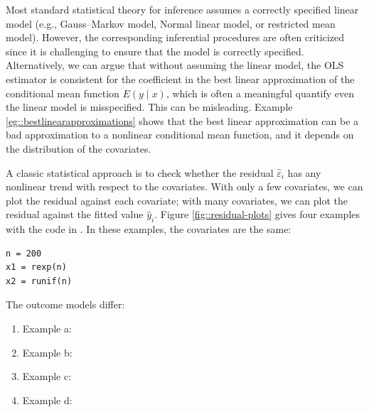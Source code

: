 Most standard statistical theory for inference assumes a correctly specified linear model (e.g., Gauss--Markov model, Normal linear model, or restricted mean model). However, the corresponding inferential procedures are often criticized since it is challenging to ensure that the model is correctly specified. Alternatively, we can argue that without assuming the linear model, the OLS estimator is consistent for the coefficient in the best linear approximation of the conditional mean function $E(y\mid x)$, which is often a meaningful quantify even the linear model is misspecified. This can be misleading. Example \ref{eg::bestlinearapproximations} shows that the best linear approximation can be a bad approximation to a nonlinear conditional mean function, and it depends on the distribution of the covariates. 



A classic statistical approach is to check whether the residual $\hat\varepsilon_i$ has any nonlinear trend with respect to the covariates. With only a few covariates, we can plot the residual against each covariate; with many covariates, we can plot the residual against the fitted value $\hat{y}_i$. Figure \ref{fig::residual-plots} gives four examples with the  code in . In these examples, the covariates are the same:
\begin{lstlisting}
n = 200
x1 = rexp(n)
x2 = runif(n)
\end{lstlisting}

The outcome models differ:
\begin{enumerate}
\item
Example a:
\item 
Example b:
\item
Example c:
\item
Example d:
\end{enumerate}



